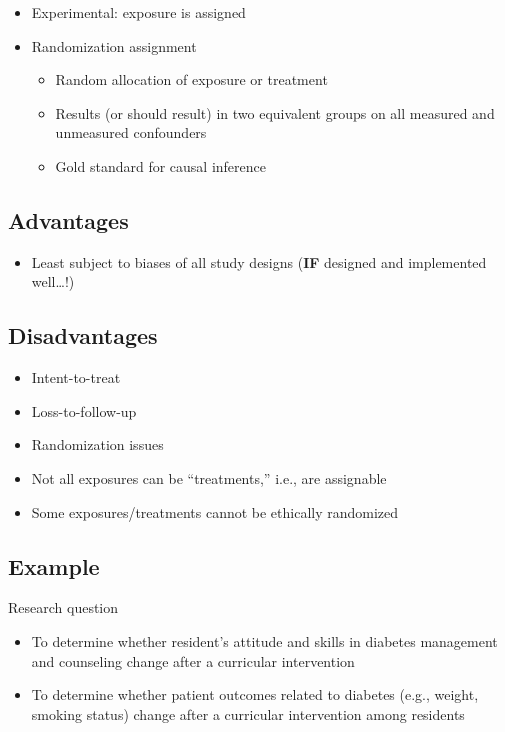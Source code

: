 \documentclass[
]{book}
\providecommand{\tightlist}{%
  \setlength{\itemsep}{0pt}\setlength{\parskip}{0pt}}
\begin{document}
\begin{itemize}
\tightlist
\item
  Experimental: exposure is assigned
\item
  Randomization assignment

  \begin{itemize}
  \tightlist
  \item
    Random allocation of exposure or treatment
  \item
    Results (or should result) in two equivalent groups on all measured and unmeasured confounders
  \item
    Gold standard for causal inference
  \end{itemize}
\end{itemize}

\hypertarget{advantages-3}{%
\subsection{Advantages}\label{advantages-3}}

\begin{itemize}
\tightlist
\item
  Least subject to biases of all study designs (\textbf{IF} designed and implemented well\ldots!)
\end{itemize}

\hypertarget{disadvantages-2}{%
\subsection{Disadvantages}\label{disadvantages-2}}

\begin{itemize}
\tightlist
\item
  Intent-to-treat
\item
  Loss-to-follow-up
\item
  Randomization issues
\item
  Not all exposures can be ``treatments,'' i.e., are assignable
\item
  Some exposures/treatments cannot be ethically randomized
\end{itemize}

\hypertarget{example-4}{%
\subsection{Example}\label{example-4}}

Research question

\begin{itemize}
\tightlist
\item
  To determine whether resident's attitude and skills in diabetes management and counseling change after a curricular intervention
\item
  To determine whether patient outcomes related to diabetes (e.g., weight, smoking status) change after a curricular intervention among residents
\end{itemize}
\end{document}
